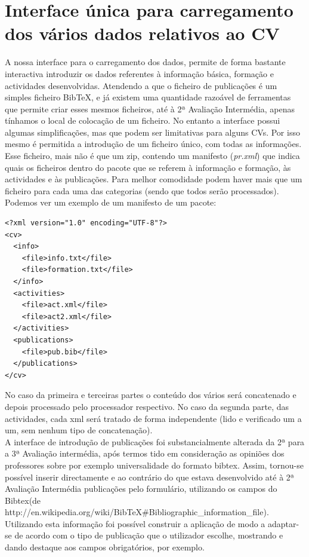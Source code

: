\documentclass[a4paper,11pt,openright,openbib]{article}
\begin{document}
\section{Interface única para carregamento dos vários dados relativos ao CV}
A nossa interface para o carregamento dos dados, permite de forma bastante interactiva introduzir os dados referentes à informação básica, formação e actividades desenvolvidas. Atendendo a que o ficheiro de publicações é um simples ficheiro BibTeX, e já existem uma quantidade razoável de ferramentas que permite criar esses mesmos ficheiros, até à 2ª Avaliação Intermédia, apenas tínhamos o local de colocação de um ficheiro. No entanto a interface possui algumas simplificações, mas que podem ser limitativas para alguns CVs. Por isso mesmo é permitida a introdução de um ficheiro único, com todas as informações. Esse ficheiro, mais não é que um zip, contendo um manifesto (\emph{pr.xml}) que indica quais os ficheiros dentro do pacote que se referem à informação e formação, às actividades e às publicações. Para melhor comodidade podem haver mais que um ficheiro para cada uma das categorias (sendo que todos serão processados). Podemos ver um exemplo de um manifesto de um pacote:
\begin{verbatim}
<?xml version="1.0" encoding="UTF-8"?>
<cv>
  <info>
    <file>info.txt</file>
    <file>formation.txt</file>
  </info>
  <activities>
    <file>act.xml</file>
    <file>act2.xml</file>
  </activities>
  <publications>
    <file>pub.bib</file>
  </publications>
</cv>
\end{verbatim}
No caso da primeira e terceiras partes o conteúdo dos vários será concatenado e depois processado pelo processador respectivo. No caso da segunda parte, das actividades, cada xml será tratado de forma independente (lido e verificado um a um, sem nenhum tipo de concatenação).\\
A interface de introdução de publicações foi substancialmente alterada da 2ª para a 3ª Avaliação intermédia, após termos tido em consideração as opiniões dos professores sobre por exemplo universalidade do formato bibtex. Assim, tornou-se possível inserir directamente e ao contrário do que estava desenvolvido até à 2ª Avaliação Intermédia publicações pelo formulário, utilizando os campos do Bibtex(de http://en.wikipedia.org/wiki/BibTeX\#Bibliographic\_information\_file). Utilizando esta informação foi possível construir a aplicação de modo a adaptar-se de acordo com o tipo de publicação que o utilizador escolhe, mostrando e dando destaque aos campos obrigatórios, por exemplo.\\
\end{document}
